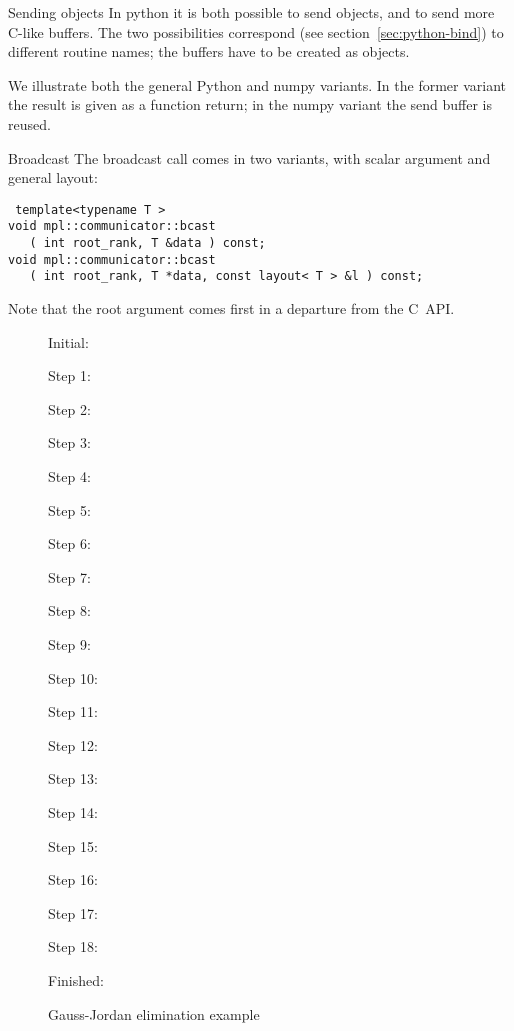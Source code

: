 \begin{pythonnote}{Sending objects}
  In python it is both possible to send objects, and to send more
  C-like buffers. The two possibilities correspond (see
  section~\ref{sec:python-bind}) to different routine names; the
  buffers have to be created as  objects.

  We illustrate both the general Python and numpy variants. 
  In the former variant the result is given as a function return;
  in the numpy variant the send buffer is reused.

\end{pythonnote}

\begin{mplnote}{Broadcast}
  The broadcast call comes in two variants, with scalar argument
  and general layout:
\begin{lstlisting}
 template<typename T >
void mpl::communicator::bcast
   ( int root_rank, T &data ) const;
void mpl::communicator::bcast
   ( int root_rank, T *data, const layout< T > &l ) const;
\end{lstlisting}
Note that the root argument comes first
in a departure from the C~\ac{API}.
\end{mplnote}

\begin{figure}[p]
  \tiny
  \begin{multicols}{3}
    Initial:\\ \nobreak
    
    Step 1:\\ \nobreak
    
    Step 2:\\ \nobreak
    
    Step 3:\\ \nobreak
    
    Step 4:\\ \nobreak
    
    Step 5:\\ \nobreak
    
    Step 6:\\ \nobreak
    
    Step 7:\\ \nobreak
    
    Step 8:\\ \nobreak
    
    Step 9:\\ \nobreak
    
    Step 10:\\ \nobreak
    
    Step 11:\\ \nobreak
    
    Step 12:\\ \nobreak
    
    Step 13:\\ \nobreak
    
    Step 14:\\ \nobreak
    
    Step 15:\\ \nobreak
    
    Step 16:\\ \nobreak
    
    Step 17:\\ \nobreak
    
    Step 18:\\ \nobreak
    
    Finished:\\ \nobreak
    
  \end{multicols}
  \caption{Gauss-Jordan elimination example}
  \label{fig:gauss-jordan-ex}
\end{figure}

